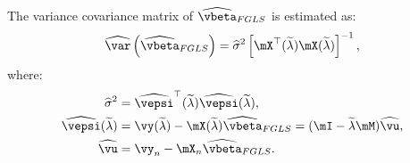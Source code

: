 \documentclass[english,12pt]{book}\usepackage[]{graphicx}\usepackage[]{xcolor}
\begin{document}
The variance covariance matrix of $\widehat{\vbeta}_{FGLS}$ is estimated as:
\begin{equation*}
  \widehat{\var}\left(\widehat{\vbeta}_{FGLS}\right) = \widehat{\sigma}^2\left[\mX^\top(\widetilde{\lambda})\mX(\widetilde{\lambda})\right]^{-1},
\end{equation*}
%
where:
\begin{equation*}
  \begin{aligned}
    \widehat{\sigma}^2 & = \widehat{\vepsi}^\top(\widetilde{\lambda})\widehat{\vepsi}(\widetilde{\lambda}), \\
    \widehat{\vepsi}(\widetilde{\lambda}) & = \vy(\widetilde{\lambda}) - \mX(\widetilde{\lambda})\widehat{\vbeta}_{FGLS} = (\mI-\widetilde{\lambda}\mM)\widehat{\vu}, \\
    \widehat{\vu} & = \vy_n-\mX_n\widehat{\vbeta}_{FGLS}. 
  \end{aligned}
\end{equation*}
\end{document}
